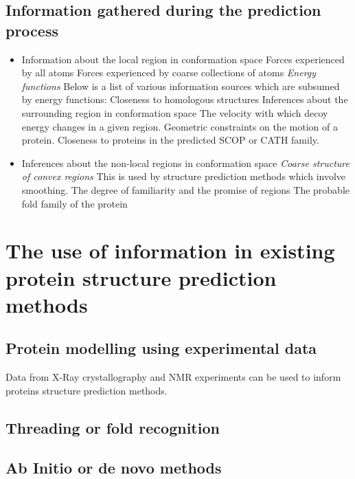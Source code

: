 \documentclass[10pt]{report}
\begin{document}
\section{Information gathered during the prediction process}

\begin{itemize}
 \item Information about the local region in conformation space
 \subitem Forces experienced by all atoms
 \subitem Forces experienced by coarse collections of atoms
 \subitem \textit{Energy functions} Below is a list of various information sources which are subsumed by energy functions:
 \subitem Closeness to homologous structures
 \subitem Inferences about the surrounding region in conformation space
 \subitem The velocity with which decoy energy changes in a given region.
 \subitem Geometric constraints on the motion of a protein.
 \subitem Closeness to proteins in the predicted SCOP or CATH family.

 \item Inferences about the non-local regions in conformation space
 \subitem \textit{Coarse structure of convex regions} This is used by structure prediction methods which involve smoothing.
 \subitem The degree of familiarity and the promise of regions
 \subitem The probable fold family of the protein
\end{itemize}

\chapter{The use of information in existing protein structure prediction methods}

\section{Protein modelling using experimental data}

Data from X-Ray crystallography and NMR experiments can be used to inform proteins structure prediction methods.

\section{Threading or fold recognition}

\section{Ab Initio or de novo methods}
\end{document}
